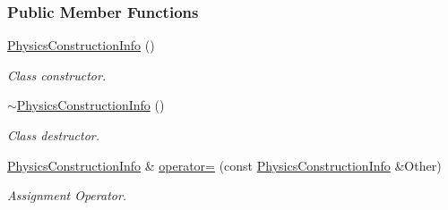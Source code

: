 \subsubsection*{Public Member Functions}
\begin{DoxyCompactItemize}
\item 
\hypertarget{classMezzanine_1_1PhysicsConstructionInfo_a5e4c8044d232f5507dfd34cb434e9145}{
\hyperlink{classMezzanine_1_1PhysicsConstructionInfo_a5e4c8044d232f5507dfd34cb434e9145}{PhysicsConstructionInfo} ()}
\label{classMezzanine_1_1PhysicsConstructionInfo_a5e4c8044d232f5507dfd34cb434e9145}

\begin{DoxyCompactList}\small\item\em Class constructor. \item\end{DoxyCompactList}\item 
\hypertarget{classMezzanine_1_1PhysicsConstructionInfo_a65a6e6cd89e4089c98919b932a12bfbe}{
\hyperlink{classMezzanine_1_1PhysicsConstructionInfo_a65a6e6cd89e4089c98919b932a12bfbe}{$\sim$PhysicsConstructionInfo} ()}
\label{classMezzanine_1_1PhysicsConstructionInfo_a65a6e6cd89e4089c98919b932a12bfbe}

\begin{DoxyCompactList}\small\item\em Class destructor. \item\end{DoxyCompactList}\item 
\hyperlink{classMezzanine_1_1PhysicsConstructionInfo}{PhysicsConstructionInfo} \& \hyperlink{classMezzanine_1_1PhysicsConstructionInfo_a5bbb296d18fed394076ae066e6862f93}{operator=} (const \hyperlink{classMezzanine_1_1PhysicsConstructionInfo}{PhysicsConstructionInfo} \&Other)
\begin{DoxyCompactList}\small\item\em Assignment Operator. \item\end{DoxyCompactList}\end{DoxyCompactItemize}
